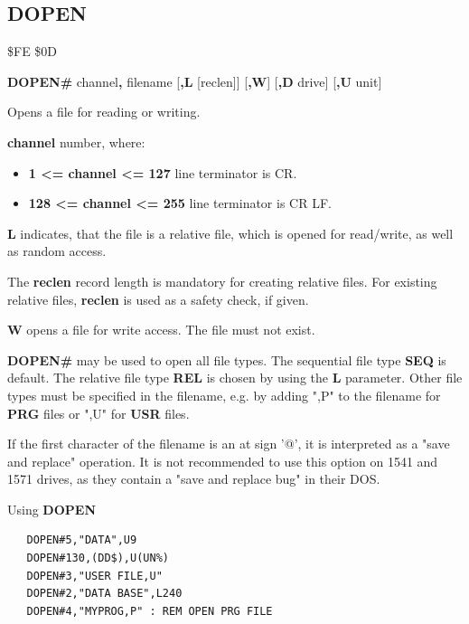 \subsection{DOPEN}
\begin{description}[leftmargin=2cm,style=nextline]
\item [Token:] \$FE \$0D
\item [Format:] {\bf DOPEN\#} channel{\bf,} filename
		[{\bf,L} [reclen]] [{\bf,W}] [{\bf,D} drive] [{\bf,U} unit]
\item [Usage:]
    Opens a file for reading or writing.

    {\bf channel} number, where:
    \begin{itemize}
        \item {\bf 1 <= channel <= 127} line terminator is CR.
        \item {\bf 128 <= channel <= 255} line terminator is CR LF.
    \end{itemize}

   {\bf L} indicates, that the file is a relative file, which
   is opened for read/write, as well as random access.

   The {\bf reclen} record length
   is mandatory for creating relative files. For existing
   relative files, {\bf reclen} is used as a safety check, if given.

   {\bf W} opens a file for write access. The file must not exist.

   \filenamedefinition

   \drivedefinition

   \unitdefinition

\item [Remarks:]
   {\bf DOPEN\#} may be used to open all file types.
   The sequential file type {\bf SEQ} is default.
   The relative file type {\bf REL} is chosen by using the
   {\bf L} parameter.  Other file types
   must be specified in the filename, e.g. by adding ",P" to the
   filename for {\bf PRG} files or ",U" for {\bf USR} files.

   If the first character of the filename is an at sign '@', it
   is interpreted as a "save and replace" operation. It is not recommended
   to use this option on 1541 and 1571 drives, as they
   contain a "save and replace bug" in their DOS.

\newpage
\item [Examples:] Using {\bf DOPEN}

\begin{tcolorbox}[colback=black,coltext=white]
\verbatimfont{\codefont}
\begin{verbatim}
   DOPEN#5,"DATA",U9
   DOPEN#130,(DD$),U(UN%)
   DOPEN#3,"USER FILE,U"
   DOPEN#2,"DATA BASE",L240
   DOPEN#4,"MYPROG,P" : REM OPEN PRG FILE
\end{verbatim}
\end{tcolorbox}
\end{description}

